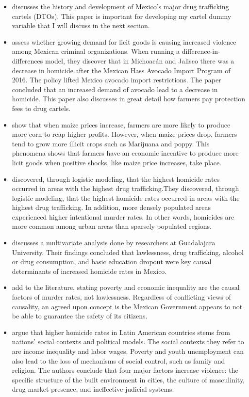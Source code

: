 \documentclass[12pt]{article}
\begin{document}
\begin{itemize}
    \item \cite{beittel2015mexico} discusses the history and development of Mexico's major drug trafficking cartels (DTOs). This paper is important for developing my cartel dummy variable that I will discuss in the next section.
    \item \cite{erickson2020blood} assess whether growing demand for licit goods is causing increased violence among Mexican criminal organizations. When running a difference-in-differences model, they discover that in Michoacán and Jalisco there was a decrease in homicide after the Mexican Hass Avocado Import Program of 2016. The policy lifted Mexico avocado import restrictions. The paper concluded that an increased demand of avocado lead to a decrease in homicide. This paper also discusses in great detail how farmers pay protection fees to drug cartels.
    \item \cite{dube2016maize} show that when maize prices increase, farmers are more likely to produce more corn to reap higher profits. However, when maize prices drop, farmers tend to grow more illicit crops such as Marijuana and poppy. This phenomena shows that farmers have an economic incentive to produce more licit goods when positive shocks, like maize price increases, take place.
    \item \cite{leenen2014temporal} discovered, through logistic modeling, that the highest homicide rates occurred in areas with the highest drug trafficking.They discovered, through logistic modeling, that the highest homicide rates occurred in areas with the highest drug trafficking. In addition, more densely populated areas experienced higher intentional murder rates. In other words, homicides are more common among urban areas than sparsely populated regions.
    \item \cite{gamlin2015violence} discusses a multivariate analysis done by researchers at Guadalajara University. Their findings concluded that lawlessness, drug trafficking, alcohol or drug consumption, and basic education dropout were key causal determinants of increased homicide rates in Mexico.
    \item \cite{lopez2014narcotrafico} add to the literature, stating poverty and economic inequality are the causal factors of murder rates, not lawlessness. Regardless of conflicting views of causality, an agreed upon concept is the Mexican Government appears to not be able to guarantee the safety of its citizens.
    \item \cite{briceno2008understanding} argue that higher homicide rates in Latin American countries stems from nations' social contexts and political models. The social contexts they refer to are income inequality and labor wages. Poverty and youth unemployment can also lead to the loss of mechanisms of social control, such as family and religion. The authors conclude that four major factors increase violence: the specific structure of the built environment in cities, the culture of masculinity, drug market presence, and ineffective judicial systems. 

\end{itemize}
\end{document}
